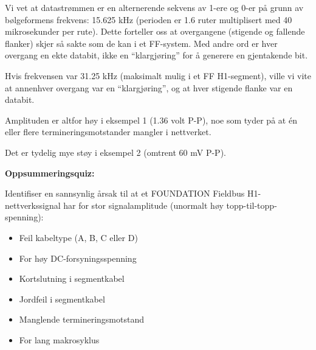 





Vi vet at datastrømmen er en alternerende sekvens av 1-ere og 0-er på grunn av bølgeformens frekvens: 15.625 kHz (perioden er 1.6 ruter multiplisert med 40 mikrosekunder per rute). Dette forteller oss at overgangene (stigende og fallende flanker) skjer så sakte som de kan i et FF-system. Med andre ord er hver overgang en ekte databit, ikke en ``klargjøring'' for å generere en gjentakende bit.

Hvis frekvensen var 31.25 kHz (maksimalt mulig i et FF H1-segment), ville vi vite at annenhver overgang var en ``klargjøring'', og at hver stigende flanke var en databit.

\vskip 10pt

Amplituden er altfor høy i eksempel 1 (1.36 volt P-P), noe som tyder på at én eller flere termineringsmotstander mangler i nettverket.

\vskip 10pt

Det er tydelig mye støy i eksempel 2 (omtrent 60 mV P-P).

\vfil \eject

\noindent
{\bf Oppsummeringsquiz:}

Identifiser en sannsynlig årsak til at et FOUNDATION Fieldbus H1-nettverkssignal har for stor signalamplitude (unormalt høy topp-til-topp-spenning):

\begin{itemize}
\item{} Feil kabeltype (A, B, C eller D)
\vskip 5pt 
\item{} For høy DC-forsyningsspenning
\vskip 5pt 
\item{} Kortslutning i segmentkabel
\vskip 5pt 
\item{} Jordfeil i segmentkabel
\vskip 5pt 
\item{} Manglende termineringsmotstand
\vskip 5pt 
\item{} For lang makrosyklus
\end{itemize}




